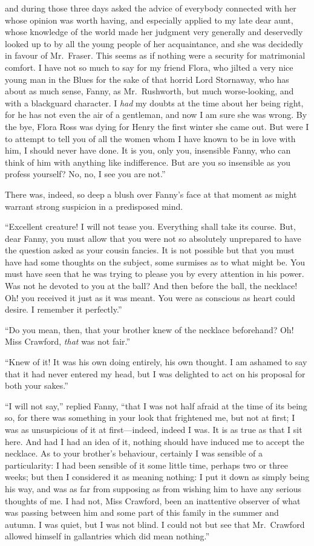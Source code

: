 \documentclass{article}
\begin{document}
and during those three days asked the advice of everybody
connected with her whose opinion was worth having,
and especially applied to my late dear aunt, whose
knowledge of the world made her judgment very generally
and deservedly looked up to by all the young people
of her acquaintance, and she was decidedly in favour
of Mr.\ Fraser.  This seems as if nothing were a security
for matrimonial comfort.  I have not so much to say
for my friend Flora, who jilted a very nice young man
in the Blues for the sake of that horrid Lord Stornaway,
who has about as much sense, Fanny, as Mr.\ Rushworth,
but much worse-looking, and with a blackguard character.
I \emph{had} my doubts at the time about her being right,
for he has not even the air of a gentleman, and now I am
sure she was wrong.  By the bye, Flora Ross was dying
for Henry the first winter she came out.  But were I
to attempt to tell you of all the women whom I have
known to be in love with him, I should never have done.
It is you, only you, insensible Fanny, who can think
of him with anything like indifference.  But are you
so insensible as you profess yourself?  No, no, I see you
are not.''

There was, indeed, so deep a blush over Fanny's face
at that moment as might warrant strong suspicion
in a predisposed mind.

``Excellent creature!  I will not tease you.  Everything shall
take its course.  But, dear Fanny, you must allow that you
were not so absolutely unprepared to have the question asked
as your cousin fancies.  It is not possible but that you
must have had some thoughts on the subject, some surmises
as to what might be.  You must have seen that he was
trying to please you by every attention in his power.
Was not he devoted to you at the ball?  And then before
the ball, the necklace!  Oh! you received it just as it
was meant.  You were as conscious as heart could desire.
I remember it perfectly.''

``Do you mean, then, that your brother knew of the
necklace beforehand?  Oh!  Miss Crawford, \emph{that} was not fair.''

``Knew of it!  It was his own doing entirely, his own thought.
I am ashamed to say that it had never entered my head,
but I was delighted to act on his proposal for both
your sakes.''

``I will not say,'' replied Fanny, ``that I was not half
afraid at the time of its being so, for there was something
in your look that frightened me, but not at first;
I was as unsuspicious of it at first---indeed, indeed I was.
It is as true as that I sit here.  And had I had an idea of it,
nothing should have induced me to accept the necklace.
As to your brother's behaviour, certainly I was sensible of
a particularity:  I had been sensible of it some little time,
perhaps two or three weeks; but then I considered it as
meaning nothing:  I put it down as simply being his way,
and was as far from supposing as from wishing him to have
any serious thoughts of me.  I had not, Miss Crawford,
been an inattentive observer of what was passing between him
and some part of this family in the summer and autumn.
I was quiet, but I was not blind.  I could not but see
that Mr.\ Crawford allowed himself in gallantries which did
mean nothing.''
\end{document}
